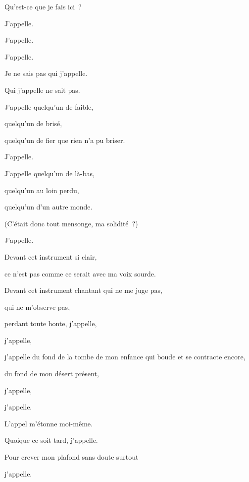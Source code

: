 {\setlength{\parskip}{0pt}

Qu'est-ce que je fais ici~?

J'appelle.

J'appelle.

J'appelle.

Je ne sais pas qui j'appelle.

Qui j'appelle ne sait pas.

J'appelle quelqu'un de faible,

quelqu'un de brisé,

quelqu'un de fier que rien n'a pu briser.

J'appelle.

J'appelle quelqu'un de là-bas,

quelqu'un au loin perdu,

quelqu'un d'un autre monde.

(C'était donc tout mensonge, ma solidité~?)

J'appelle.

Devant cet instrument si clair,

ce n'est pas comme ce serait avec ma voix sourde.

Devant cet instrument chantant qui ne me juge pas,

qui ne m'observe pas,

perdant toute honte, j'appelle,

j'appelle,

j'appelle du fond de la tombe de mon enfance qui boude et se contracte
encore,

du fond de mon désert présent,

j'appelle,

j'appelle.

L'appel m'étonne moi-même.

Quoique ce soit tard, j'appelle.

Pour crever mon plafond sans doute surtout

j'appelle.\setlength{\parskip}{6pt}
}

